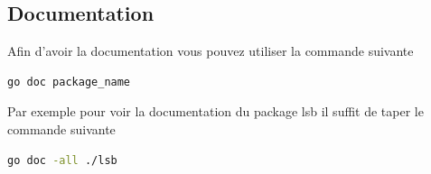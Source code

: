 \documentclass[letterpaper,12pt, french]{article}
\begin{document}
\subsection{Documentation}
\label{sec:orge5b0aab}
Afin d'avoir la documentation vous pouvez utiliser la commande suivante
\begin{lstlisting}[language=bash]
go doc package_name
\end{lstlisting}
\vspace{1\baselineskip}
\space
Par exemple pour voir la documentation du package lsb il suffit de taper le commande suivante
\begin{lstlisting}[language=bash]
go doc -all ./lsb
\end{lstlisting}
\clearpage
\printbibliography
\end{document}
